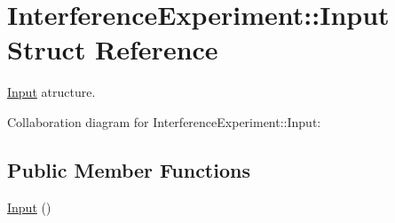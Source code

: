 \hypertarget{structInterferenceExperiment_1_1Input}{}\section{Interference\+Experiment\+:\+:Input Struct Reference}
\label{structInterferenceExperiment_1_1Input}


\hyperlink{structInterferenceExperiment_1_1Input}{Input} atructure.  




Collaboration diagram for Interference\+Experiment\+:\+:Input\+:
\subsection*{Public Member Functions}
\begin{DoxyCompactItemize}
\item 
\hyperlink{structInterferenceExperiment_1_1Input_ae0c591d489f1721214424c03ca204ecc}{Input} ()
\end{DoxyCompactItemize}
